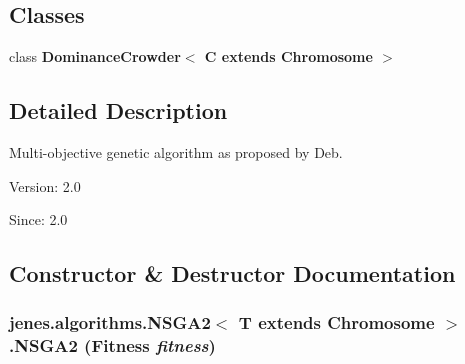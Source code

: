 \subsection*{Classes}
\begin{CompactItemize}
\item 
class \textbf{DominanceCrowder$<$ C extends Chromosome $>$}
\end{CompactItemize}


\subsection{Detailed Description}
Multi-objective genetic algorithm as proposed by Deb.

\begin{Desc}
\item[Version:]2.0 \end{Desc}
\begin{Desc}
\item[Since:]2.0 \end{Desc}


\subsection{Constructor \& Destructor Documentation}
\hypertarget{classjenes_1_1algorithms_1_1_n_s_g_a2_3_01_t_01extends_01_chromosome_01_4_0e9264bdd3c0f0f73fecdc89038b2898}{
\subsubsection[NSGA2]{\setlength{\rightskip}{0pt plus 5cm}jenes.algorithms.NSGA2$<$ T extends Chromosome $>$.NSGA2 (Fitness {\em fitness})}}
\label{classjenes_1_1algorithms_1_1_n_s_g_a2_3_01_t_01extends_01_chromosome_01_4_0e9264bdd3c0f0f73fecdc89038b2898}


